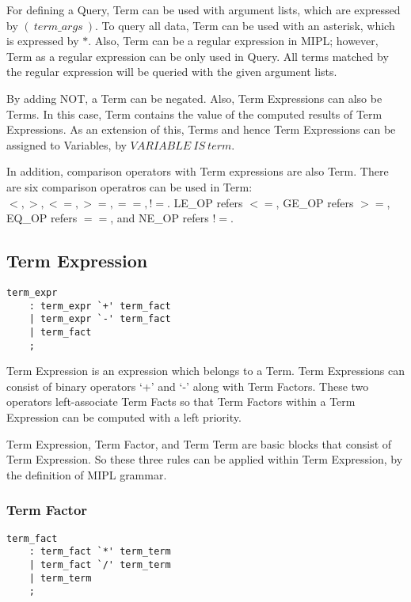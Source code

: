 \documentclass[prodmode,acmtecs]{acmsmall}
\begin{document}
For defining a Query, Term can be used with argument lists, which are expressed by
$(\ term\_args\ )$. To query all data, Term can be used with an asterisk, which
is expressed by $*$. Also, Term can be a regular expression in MIPL; however,
Term as a regular expression can be only used in Query. All terms matched by the
regular expression will be queried with the given argument lists.
\medskip

By adding NOT, a Term can be negated. Also, Term Expressions can also be Terms.
In this case, Term contains the value of the computed results of Term Expressions.
As an extension of this, Terms and hence Term Expressions can be assigned to Variables,
by $VARIABLE\ IS\ term$.
\medskip

In addition, comparison operators with Term expressions are also Term. There are six
comparison operatros can be used in Term: $<, >, <=, >=, ==, !=$. LE\_OP refers $<=$,
GE\_OP refers $>=$, EQ\_OP refers $==$, and NE\_OP refers $!=$.
\medskip


\subsection{Term Expression}
\begin{lstlisting}
term_expr
	: term_expr `+' term_fact
	| term_expr `-' term_fact
	| term_fact
	;
\end{lstlisting}

Term Expression is an expression which belongs to a Term.  Term 
Expressions can consist of binary operators `+' and `-' along with Term
Factors. These two operators left-associate Term Facts so that Term
Factors within a Term Expression can be computed with a left priority.

Term Expression, Term Factor, and Term Term are basic blocks that
consist of Term Expression.  So these three rules can be applied within
Term Expression, by the definition of MIPL grammar.
\medskip

\subsubsection{Term Factor}

\begin{lstlisting}
term_fact
	: term_fact `*' term_term
	| term_fact `/' term_term
	| term_term
	;
\end{lstlisting}
\end{document}
